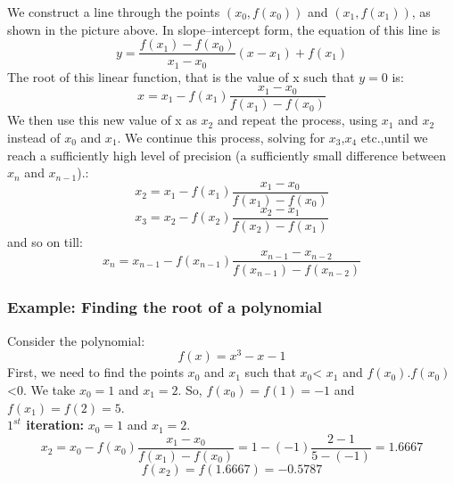 \documentclass[a4paper, 12pt]{report}
\begin{document}
    We construct a line through the points $(x_{0}, f(x_{0}))$ and $(x_{1}, f(x_{1}))$, as shown in the picture above. In slope–intercept form, the equation of this line is
    \begin{equation}
        y = \frac{f(x_{1})-f(x_{0})}{x_{1}-x_{0}} (x-x_{1}) + f(x_{1})
    \end{equation}
    The root of this linear function, that is the value of x such that $y=0$ is:
    \begin{equation}
    x = x_{1} - f(x_{1})\frac{x_{1} - x_{0}}{f(x_{1}) -f(x_{0}) }
    \end{equation}
    We then use this new value of x as $x_{2}$ and repeat the process, using $x_{1}$ and $x_{2}$ instead of $x_{0}$ and $x_{1}$. We continue this process, solving for $x_{3}$,$x_{4}$ etc.,until we reach a sufficiently high level of precision (a sufficiently small difference between $x_{n}$ and $x_{n-1}$).:
    \begin{equation}
    x_{2} = x_{1} - f(x_{1})\frac{x_{1} - x_{0}}{f(x_{1}) -f(x_{0}) }
    \end{equation}
    \begin{equation}
    x_{3} = x_{2} - f(x_{2})\frac{x_{2} - x_{1}}{f(x_{2}) -f(x_{1}) }
    \end{equation}
    and so on till:
    \begin{equation}
    x_{n}= x_{n-1} - f(x_{n-1})\frac{x_{n-1} - x_{n-2}}{f(x_{n-1}) -f(x_{n-2}) }
    \end{equation}
    \subsubsection{Example: Finding the root of a polynomial}
    Consider the polynomial:
    \begin{equation}
        f(x) = x^{3} - x - 1
    \end{equation}
    First, we need to find the points $x_{0}$ and $x_{1}$ such that $x_{0}$< $x_{1}$ and $f(x_{0})$.$f(x_{0})$ <0. We take $x_{0}=1$ and $x_{1}=2$. So, $f(x_{0})=f(1)=-1$ and $f(x_{1})=f(2)=5$.\\
    \textbf{$1^{st}$ iteration:} $x_{0}=1$ and $x_{1}=2$.
    \begin{equation}
    x_{2} = x_{0} - f(x_{0})\frac{x_{1} - x_{0}}{f(x_{1}) -f(x_{0}) } = 1-(-1)\frac{2-1}{5-(-1)} = 1.6667
    \end{equation}
    \begin{equation}
        f(x_{2}) =f(1.6667) = -0.5787
    \end{equation}
    
\end{document}
